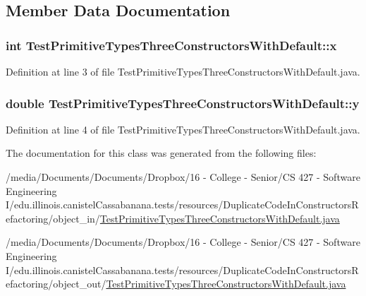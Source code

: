 \subsection{Member Data Documentation}
\hypertarget{classTestPrimitiveTypesThreeConstructorsWithDefault_a5e4c988b58349e4fceabc073d36619f4}{
\subsubsection[{x}]{\setlength{\rightskip}{0pt plus 5cm}int {\bf TestPrimitiveTypesThreeConstructorsWithDefault::x}}}
\label{classTestPrimitiveTypesThreeConstructorsWithDefault_a5e4c988b58349e4fceabc073d36619f4}


Definition at line 3 of file TestPrimitiveTypesThreeConstructorsWithDefault.java.

\hypertarget{classTestPrimitiveTypesThreeConstructorsWithDefault_ad6a2a263ac5e32f812d30c63fd20ca98}{
\subsubsection[{y}]{\setlength{\rightskip}{0pt plus 5cm}double {\bf TestPrimitiveTypesThreeConstructorsWithDefault::y}}}
\label{classTestPrimitiveTypesThreeConstructorsWithDefault_ad6a2a263ac5e32f812d30c63fd20ca98}


Definition at line 4 of file TestPrimitiveTypesThreeConstructorsWithDefault.java.



The documentation for this class was generated from the following files:\begin{DoxyCompactItemize}
\item 
/media/Documents/Documents/Dropbox/16 -\/ College -\/ Senior/CS 427 -\/ Software Engineering I/edu.illinois.canistelCassabanana.tests/resources/DuplicateCodeInConstructorsRefactoring/object\_\-in/\hyperlink{object__in_2TestPrimitiveTypesThreeConstructorsWithDefault_8java}{TestPrimitiveTypesThreeConstructorsWithDefault.java}\item 
/media/Documents/Documents/Dropbox/16 -\/ College -\/ Senior/CS 427 -\/ Software Engineering I/edu.illinois.canistelCassabanana.tests/resources/DuplicateCodeInConstructorsRefactoring/object\_\-out/\hyperlink{object__out_2TestPrimitiveTypesThreeConstructorsWithDefault_8java}{TestPrimitiveTypesThreeConstructorsWithDefault.java}\end{DoxyCompactItemize}
